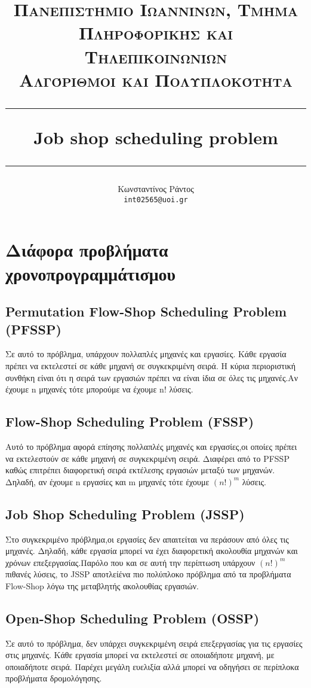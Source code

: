 \documentclass{article}
\title{%
   \normalsize \textsc{Πανεπιστήμιο Ιωαννίνων, Τμήμα Πληροφορικής και Τηλεπικοινωνίων} \\ [1em]
   \normalsize \textsc{Αλγόριθμοι και Πολυπλοκότητα} \\ [1em]
   \vspace{0.5cm}
   \hrule
   \vspace{0.4cm}
   \huge Job shop scheduling problem
   \vspace{0.5cm}
   \hrule
   \vspace{0.5cm}
}
\author{%
   \normalfont
   Κωνσταντίνος Ράντος\\
   \texttt{int02565@uoi.gr}  
}
\date{}
\begin{document}
\maketitle
\vspace{0.4cm}



\section{Διάφορα προβλήματα χρονοπρογραμμάτισμου}
\vspace{0.2cm}

\subsection {Permutation Flow-Shop Scheduling Problem (PFSSP) }
Σε αυτό το πρόβλημα, υπάρχουν πολλαπλές μηχανές και εργασίες. Κάθε εργασία πρέπει να εκτελεστεί σε κάθε μηχανή σε συγκεκριμένη σειρά. Η κύρια περιοριστική συνθήκη είναι ότι η σειρά των εργασιών πρέπει να είναι ίδια σε όλες τις μηχανές.Αν έχουμε n μηχανές τότε μπορούμε να έχουμε n! λύσεις.

\subsection{Flow-Shop Scheduling Problem (FSSP)}
Αυτό το πρόβλημα αφορά επίησης πολλαπλές μηχανές και εργασίες,οι οποίες πρέπει να εκτελεστούν σε κάθε μηχανή σε συγκεκριμένη σειρά. Διαφέρει από το PFSSP καθώς επιτρέπει διαφορετική σειρά εκτέλεσης εργασιών μεταξύ των μηχανών. Δηλαδή, αν έχουμε n εργασίες και m μηχανές τότε έχουμε $(n!)^m$ λύσεις.

\subsection{Job Shop Scheduling Problem (JSSP)}
Στο συγκεκριμένο πρόβλημα,οι εργασίες δεν απαιτείται να περάσουν από όλες τις μηχανές. Δηλαδή, κάθε εργασία μπορεί να έχει διαφορετική ακολουθία μηχανών και χρόνων επεξεργασίας.Παρόλο που και σε αυτή την περίπτωση υπάρχουν $(n!)^m$ πιθανές λύσεις, το JSSP αποτλείένα πιο πολύπλοκο πρόβλημα από τα προβλήματα Flow-Shop λόγω της μεταβλητής ακολουθίας εργασιών.

\subsection{Open-Shop Scheduling Problem (OSSP)}
Σε αυτό το πρόβλημα, δεν υπάρχει συγκεκριμένη σειρά επεξεργασίας για τις εργασίες στις μηχανές.
Κάθε εργασία μπορεί να εκτελεστεί σε οποιαδήποτε μηχανή, με οποιαδήποτε σειρά. Παρέχει μεγάλη ευελιξία αλλά μπορεί να οδηγήσει σε περίπλοκα προβλήματα δρομολόγησης.
\end{document}
